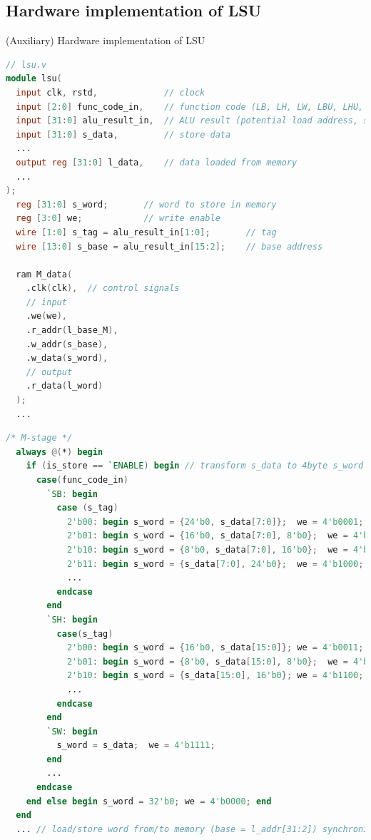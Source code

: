 \documentclass[dvipdfmx, 11pt, aspectratio=169]{beamer}   %
\begin{document}
\subsection{Hardware implementation of LSU}
\begin{frame}[fragile]{(Auxiliary) Hardware implementation of LSU}
    \begin{lstlisting}[language=verilog, basicstyle=\ttfamily\tiny]
// lsu.v
module lsu(
  input clk, rstd,             // clock
  input [2:0] func_code_in,    // function code (LB, LH, LW, LBU, LHU, SB, SH, SW)
  input [31:0] alu_result_in,  // ALU result (potential load address, store address)
  input [31:0] s_data,         // store data
  ...
  output reg [31:0] l_data,    // data loaded from memory
  ...
);
  reg [31:0] s_word;       // word to store in memory
  reg [3:0] we;            // write enable
  wire [1:0] s_tag = alu_result_in[1:0];       // tag
  wire [13:0] s_base = alu_result_in[15:2];    // base address
  
  ram M_data(
    .clk(clk),  // control signals
    // input
    .we(we),
    .r_addr(l_base_M), 
    .w_addr(s_base),
    .w_data(s_word),
    // output
    .r_data(l_word)
  );
  ...
\end{lstlisting}
\end{frame}
\begin{frame}[fragile]%
    \begin{lstlisting}[language=verilog, basicstyle=\ttfamily\tiny]
  /* M-stage */
  always @(*) begin
    if (is_store == `ENABLE) begin // transform s_data to 4byte s_word as it corresponds to we
      case(func_code_in)
        `SB: begin
          case (s_tag)
            2'b00: begin s_word = {24'b0, s_data[7:0]};  we = 4'b0001; end
            2'b01: begin s_word = {16'b0, s_data[7:0], 8'b0};  we = 4'b0010; end
            2'b10: begin s_word = {8'b0, s_data[7:0], 16'b0};  we = 4'b0100; end
            2'b11: begin s_word = {s_data[7:0], 24'b0};  we = 4'b1000; end
            ...
          endcase
        end
        `SH: begin
          case(s_tag)
            2'b00: begin s_word = {16'b0, s_data[15:0]}; we = 4'b0011; end
            2'b01: begin s_word = {8'b0, s_data[15:0], 8'b0};  we = 4'b0110; end
            2'b10: begin s_word = {s_data[15:0], 16'b0}; we = 4'b1100; end
            ...
          endcase
        end
        `SW: begin 
          s_word = s_data;  we = 4'b1111;
        end
        ...
      endcase
    end else begin s_word = 32'b0; we = 4'b0000; end
  end
  ... // load/store word from/to memory (base = l_addr[31:2]) synchronized with clk
\end{lstlisting}
\end{frame}
\end{document}
